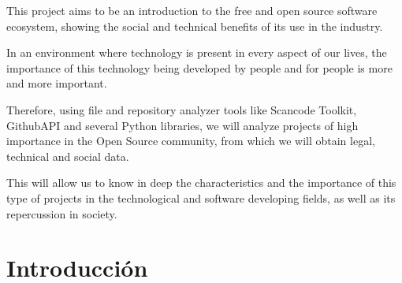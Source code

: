 \documentclass[a4paper, spanish, 12pt]{book}
\begin{document}
This project aims to be an introduction to the free and open source software ecosystem,
showing the social and technical benefits of its use in the industry.\par
\vspace{0.3cm}
In an environment where technology is present in every aspect of our lives,
the importance of this technology being developed by people and for people is
more and more important.\par
\vspace{0.3cm}
Therefore, using file and repository analyzer tools like Scancode Toolkit, GithubAPI
and several Python libraries, we will analyze projects of high importance in the
Open Source community, from which we will obtain legal, technical and social data.\par
\vspace{0.3cm}
This will allow us to know in deep the characteristics and the importance of this
type of projects in the technological and software developing fields, as well
as its repercussion in society.



\tableofcontents
\cleardoublepage
\listoffigures %



\cleardoublepage
\chapter{Introducci\'on}
\label{sec:intro} %
\end{document}
